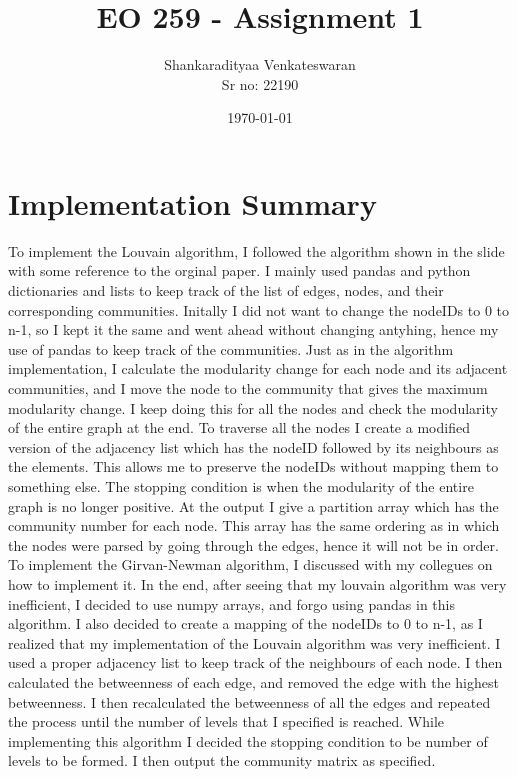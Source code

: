 \documentclass[12pt]{article}
\title{EO 259 - Assignment 1}
\author{Shankaradityaa Venkateswaran\\ Sr no: 22190}
\date{\today}
\begin{document}
\begin{titlepage}
    \maketitle
\end{titlepage}

\section{Implementation Summary}
To implement the Louvain algorithm, I followed the algorithm shown in the slide with some reference to the orginal paper. I mainly used pandas and python dictionaries and lists to keep track of the list of edges, nodes, and their corresponding communities. Initally I did not want to change the nodeIDs to 0 to n-1, so I kept it the same and went ahead without changing antyhing, hence my use of pandas to keep track of the communities. Just as in the algorithm implementation, I calculate the modularity change for each node and its adjacent communities, and I move the node to the community that gives the maximum modularity change. I keep doing this for all the nodes and check the modularity of the entire graph at the end. To traverse all the nodes I create a modified version of the adjacency list which has the nodeID followed by its neighbours as the elements. This allows me to preserve the nodeIDs without mapping them to something else. The stopping condition is when the modularity of the entire graph is no longer positive. At the output I give a partition array which has the community number for each node. This array has the same ordering as in which the nodes were parsed by going through the edges, hence it will not be in order.\\
To implement the Girvan-Newman algorithm, I discussed with my collegues on how to implement it. In the end, after seeing that my louvain algorithm was very inefficient, I decided to use numpy arrays, and forgo using pandas in this algorithm. I also decided to create a mapping of the nodeIDs to 0 to n-1, as I realized that my implementation of the Louvain algorithm was very inefficient. I used a proper adjacency list to keep track of the neighbours of each node. I then calculated the betweenness of each edge, and removed the edge with the highest betweenness. I then recalculated the betweenness of all the edges and repeated the process until the number of levels that I specified is reached. While implementing this algorithm I decided the stopping condition to be number of levels to be formed. I then output the community matrix as specified.\\
\end{document}
